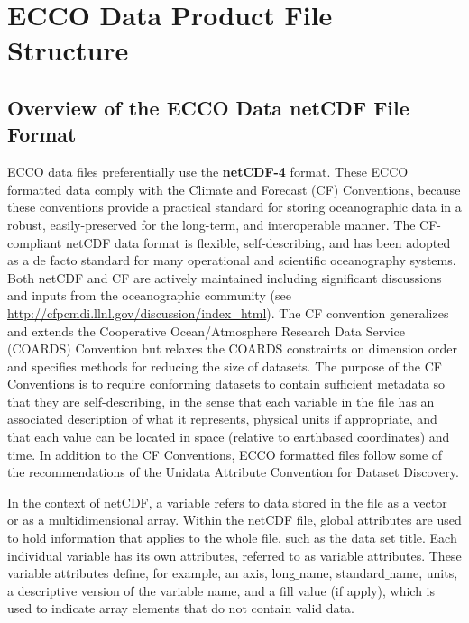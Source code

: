
\pagebreak

\section{ECCO Data Product File Structure}
\subsection{Overview of the ECCO Data netCDF File Format}

ECCO data files preferentially use the \textbf{netCDF-4} format. These ECCO formatted data comply with the Climate and Forecast (CF) Conventions, because these conventions provide a practical standard for storing oceanographic data in a robust, easily-preserved for the long-term, and interoperable manner. The CF-compliant netCDF data format is flexible, self-describing, and has been adopted as a de facto standard for many operational and scientific oceanography systems. Both netCDF and CF are actively maintained
including significant discussions and inputs from the oceanographic community (see \url{http://cfpcmdi.llnl.gov/discussion/index\_html}). 
The CF convention generalizes and extends the Cooperative Ocean/Atmosphere Research Data Service (COARDS) Convention but relaxes the COARDS constraints on dimension order and specifies methods for reducing the size of datasets. The purpose
of the CF Conventions is to require conforming datasets to contain sufficient metadata so that they are
self-describing, in the sense that each variable in the file has an associated description of what it
represents, physical units if appropriate, and that each value can be located in space (relative to earthbased coordinates) and time. In addition to the CF Conventions, ECCO formatted files follow some of the recommendations of the Unidata Attribute Convention for Dataset Discovery. \par \vspace{0.1in}

In the context of netCDF, a variable refers to data stored in the file as a vector or as a
multidimensional array. Within the netCDF file, global attributes are used to hold information that applies to the whole file, such
as the data set title. Each individual variable has its own attributes, referred to as variable attributes. These variable attributes define, for example, an axis, long$\_$name, standard$\_$name, units, a descriptive version of the variable name, and a fill value (if apply), which is used to indicate array elements that do not
contain valid data.

